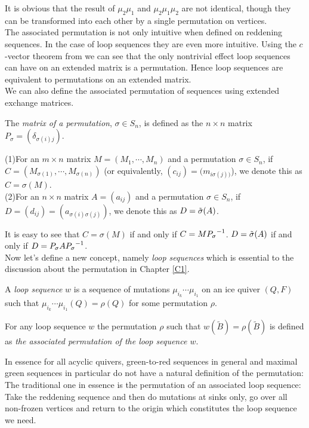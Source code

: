 \indent It is obvious that the result of $\mu_2\mu_1$ and $\mu_2\mu_1\mu_2$ are not identical, though they can be transformed into each other by a single permutation on vertices.\\
\indent The associated permutation is not only intuitive when defined on reddening sequences. In the case of loop sequences they are even more intuitive. Using the $c$-vector theorem from \cite{ST12} we can see that the only nontrivial effect loop sequences can have on an extended matrix is a permutation. Hence loop sequences are equivalent to permutations on an extended matrix.\\
\indent We can also define the associated permutation of sequences using extended exchange matrices.\\
\begin{definition}
The \textit{matrix of a permutation}, $\sigma\in S_n$, is defined as the $n\times n$ matrix $P_\sigma=(\delta_{\sigma(i)j})$.\\
\end{definition}
\begin{definition}
(1)For an $m\times n$ matrix $M=(M_1,\cdots, M_n)$ and a permutation $\sigma\in S_n$, if $C=(M_{\sigma(1)},\cdots,M_{\sigma(n)})$ (or equivalently, $(c_{ij})=(m_{i\sigma(j))}$), we denote this as $C=\sigma(M)$.\\
(2)For an $n\times n$ matrix $A=(a_{ij})$ and a permutation $\sigma\in S_n$, if $D=(d_{ij})=(a_{\sigma(i)\sigma(j)})$, we denote this as $D=\tilde{\sigma}(A)$.\\
\end{definition}
\indent It is easy to see that $C=\sigma(M)$ if and only if $C=M{P_{\sigma}}^{-1}$. $D=\tilde{\sigma}(A)$ if and only if $D=P_{\sigma} A{P_{\sigma}}^{-1}$.\\
\indent Now let's define a new concept, namely \textit{loop sequences} which is essential to the discussion about the permutation in Chapter \ref{C1}.\\
\begin{definition} 
A \textit{loop sequence} $w$ is a sequence of mutations $\mu_{i_k}\cdots\mu_{i_1}$ on an ice quiver $(Q,F)$ such that $\mu_{i_k}\cdots\mu_{i_1}(Q) = \rho(Q)$ for some permutation $\rho$.\\
\end{definition}
\begin{example}
\end{example}
\begin{definition}
For any loop sequence $w$ the permutation $\rho$ such that $w(\tilde{B})=\rho(\tilde{B})$ is defined as \textit{the associated permutation of the loop sequence $w$}.\\
\end{definition}
\indent In essence for all acyclic quivers, green-to-red sequences in general and maximal green sequences in particular do not have a natural definition of the permutation: The traditional one in essence is the permutation of an associated loop sequence: Take the reddening sequence and then do mutations at sinks only, go over all non-frozen vertices and return to the origin which constitutes the loop sequence we need.\\
